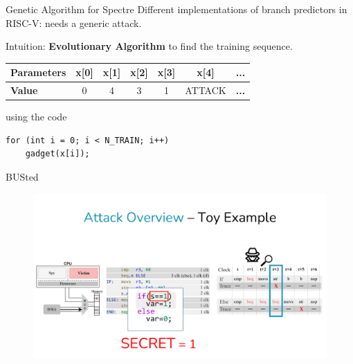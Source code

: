 \documentclass{beamer}
\begin{document}
\begin{frame}[fragile]{Genetic Algorithm for Spectre\cite{bourgeoisat-2023}}
Different implementations of branch predictors in RISC-V: needs a generic attack.

Intuition: \textbf{Evolutionary Algorithm} to find the training sequence.

\begin{table}
\begin{center}
\begin{tabular}[c]{|l|c|c|c|c|c|c|}
\hline
\textbf{Parameters} & \textbf{x[0]} & \textbf{x[1]} & \textbf{x[2]} & \textbf{x[3]} & \textbf{x[4]} & \textbf{...} \\
\hline
\textbf{Value} & 0 & 4 & 3 & 1 & ATTACK & \textbf{...} \\
\hline
\end{tabular}
\end{center}
\end{table}

using the code

\begin{lstlisting}
for (int i = 0; i < N_TRAIN; i++)
    gadget(x[i]);
\end{lstlisting}

\end{frame}

\begin{frame}{BUSted\cite{BUSted}}
\begin{figure}
    \begin{center}
        \includegraphics[width=1\textwidth]{img/busted1.pdf}
    \end{center}
\end{figure} 
\end{frame}
\end{document}
